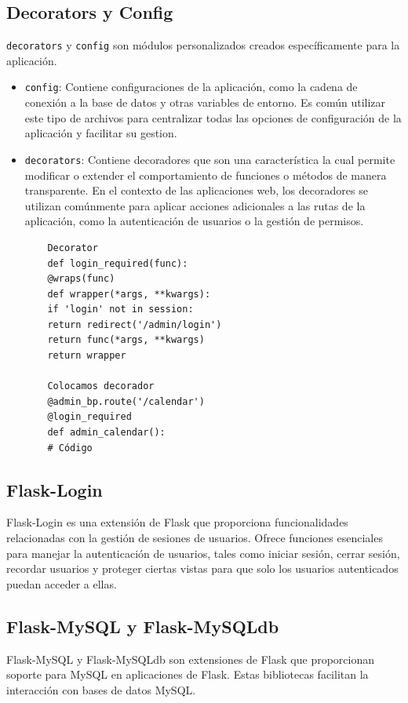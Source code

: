 \documentclass[a4paper, 12pt]{book}
\begin{document}
\subsection{Decorators y Config}
\texttt{decorators} y \texttt{config} son módulos personalizados creados específicamente para la aplicación. 
\begin{itemize}
  \item \texttt{config}: Contiene configuraciones de la aplicación, como la cadena de conexión a la base de datos y otras variables de entorno. Es común utilizar este tipo de archivos para centralizar todas las opciones de configuración de la aplicación y facilitar su gestion.
  \item \texttt{decorators}: Contiene decoradores que son una característica la cual permite modificar o extender el comportamiento de funciones o métodos de manera transparente. En el contexto de las aplicaciones web, los decoradores se utilizan comúnmente para aplicar acciones adicionales a las rutas de la aplicación, como la autenticación de usuarios o la gestión de permisos.
  \begin{verbatim}
    Decorator
    def login_required(func):
    @wraps(func)
    def wrapper(*args, **kwargs):
    if 'login' not in session:
    return redirect('/admin/login')
    return func(*args, **kwargs)
    return wrapper
    
    Colocamos decorador
    @admin_bp.route('/calendar')
    @login_required
    def admin_calendar():
    # Código
    \end{verbatim}
\end{itemize}

\subsection{Flask-Login}
\label{subsec:flasklogin} 
Flask-Login es una extensión de Flask que proporciona funcionalidades relacionadas con la gestión de sesiones de usuarios. 
Ofrece funciones esenciales para manejar la autenticación de usuarios, tales como iniciar sesión, cerrar sesión, recordar usuarios y proteger ciertas 
vistas para que solo los usuarios autenticados puedan acceder a ellas.

\subsection{Flask-MySQL y Flask-MySQLdb} 
\label{subsec:flaskmysqldb} 
Flask-MySQL y Flask-MySQLdb son extensiones de Flask que proporcionan soporte para MySQL en aplicaciones de Flask. Estas bibliotecas facilitan la interacción con bases de datos MySQL.
\end{document}
